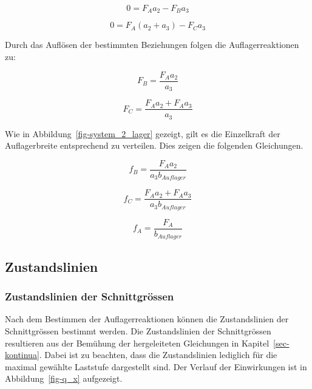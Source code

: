 \documentclass[
  12pt,
  letterpaper,
  egregdoesnotlikesansseriftitles]{scrreprt}
\begin{document}
\begin{equation}0 = F_{A} a_{2} - F_{B} a_{3}\end{equation}

\begin{equation}0 = F_{A} \left(a_{2} + a_{3}\right) - F_{C} a_{3}\end{equation}

Durch das Auflösen der bestimmten Beziehungen folgen die
Auflagerreaktionen zu:

\begin{equation}F_{B} = \frac{F_{A} a_{2}}{a_{3}}\end{equation}

\begin{equation}F_{C} = \frac{F_{A} a_{2} + F_{A} a_{3}}{a_{3}}\end{equation}

Wie in Abbildung~\ref{fig-system_2_lager} gezeigt, gilt es die
Einzelkraft der Auflagerbreite entsprechend zu verteilen. Dies zeigen
die folgenden Gleichungen.

\begin{equation}f_{B} = \frac{F_{A} a_{2}}{a_{3} b_{Auflager}}\end{equation}

\begin{equation}f_{C} = \frac{F_{A} a_{2} + F_{A} a_{3}}{a_{3} b_{Auflager}}\end{equation}

\begin{equation}f_{A} = \frac{F_{A}}{b_{Auflager}}\end{equation}

\subsection{Zustandslinien}\label{zustandslinien}

\subsubsection{Zustandslinien der
Schnittgrössen}\label{zustandslinien-der-schnittgruxf6ssen}

Nach dem Bestimmen der Auflagerreaktionen können die Zustandslinien der
Schnittgrössen bestimmt werden. Die Zustandslinien der Schnittgrössen
resultieren aus der Bemühung der hergeleiteten Gleichungen in
Kapitel~\ref{sec-kontinua}. Dabei ist zu beachten, dass die
Zustandslinien lediglich für die maximal gewählte Laststufe dargestellt
sind. Der Verlauf der Einwirkungen ist in Abbildung~\ref{fig-q_x}
aufgezeigt.
\end{document}
